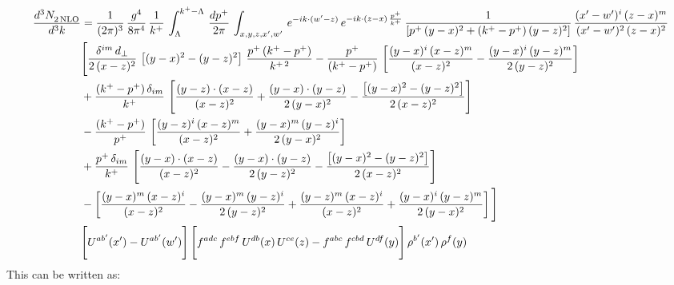 \documentclass[9pt]{article}
\numberwithin{equation}{section}
\begin{document}
\begin{align}
    \frac{d^{3}N_{2\,\rm NLO}^{\rm}}{d^{3}k}  & =  \frac{1}{(2\pi)^{3}}\,\frac{g^{4}}{8\pi^{4}}\,\frac{1}{k^{+}}\,\int_{\Lambda}^{k^{+}-\Lambda}\, \frac{dp^{+}}{2\pi} \,\int_{x,y,z,x',w'}\,e^{-ik\cdot(w'-z)}\,e^{-ik\cdot (z-x)\,\frac{p^{+}}{k^{+}}}\,\frac{1}{\left[p^{+}\,(y-x)^{2}+(k^{+}-p^{+})\,(y-z)^{2}\right]}\, \frac{(x'-w')^{i}\,(z-x)^{m}}{(x'-w')^{2}\,(z-x)^{2}} \notag \\ & \Bigg[\frac{\delta^{im}\,d_{\perp}}{2\,(x-z)^{2}}\,\left[(y-x)^{2}-(y-z)^{2}\right]\,\frac{p^{+}\,(k^{+}-p^{+})}{k^{+\,2}}-\frac{p^{+}}{(k^{+}-p^{+})}\,\left[\frac{(y-x)^{i}\,(x-z)^{m}}{(x-z)^{2}}-\frac{(y-x)^{i}\,(y-z)^{m}}{2\,(y-z)^{2}}\right]\notag \\ & +\frac{(k^{+}-p^{+})\,\delta_{im}}{k^{+}}\,\left[\frac{(y-z)\cdot (x-z)}{(x-z)^{2}}+\frac{(y-x)\cdot (y-z)}{2\,(y-x)^{2}}-\frac{\left[(y-x)^{2}-(y-z)^{2}\right]}{2\,(x-z)^{2}}\right]\notag \\ & -\frac{(k^{+}-p^{+})}{p^{+}}\,\left[\frac{(y-z)^{i}\,(x-z)^{m}}{(x-z)^{2}}+\frac{(y-x)^{m}\,(y-z)^{i}}{2\,(y-x)^{2}}\right]\notag \\ & +\frac{p^{+}\,\delta_{im}}{k^{+}}\,\left[\frac{(y-x)\cdot (x-z)}{(x-z)^{2}}-\frac{(y-x)\cdot (y-z)}{2\,(y-z)^{2}}-\frac{\left[(y-x)^{2}-(y-z)^{2}\right]}{2\,(x-z)^{2}}\right]\notag \\ &-\left[\frac{(y-x)^{m}\,(x-z)^{i}}{(x-z)^{2}}-\frac{(y-x)^{m}\,(y-z)^{i}}{2\,(y-z)^{2}}+\frac{(y-z)^{m}\,(x-z)^{i}}{(x-z)^{2}}+\frac{(y-x)^{i}\,(y-z)^{m}}{2\,(y-x)^{2}}\right]\Bigg] \notag \\ & \Bigg[U^{ab'}(x')-U^{ab'}(w')\Bigg]\,\Bigg[f^{adc}\,f^{ebf}\,U^{db}(x)\,U^{ce}(z)-f^{abc}\,f^{cbd}\,U^{df}(y)\Bigg]\,\rho^{b'}(x')\,\rho^{f}(y)
\end{align}
This can be written as: 
\end{document}
